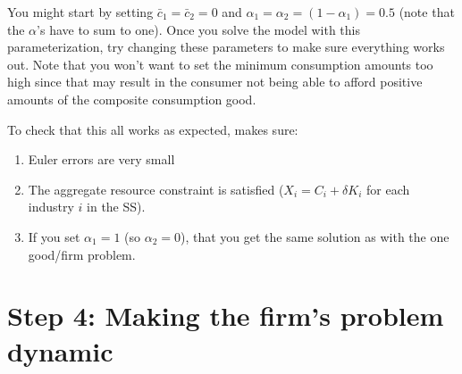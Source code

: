 \documentclass[letterpaper,12pt]{article}
\theoremstyle{definition}
\begin{document}
\begin{spacing}{1.5}
You might start by setting $\bar{c}_{1}=\bar{c}_{2}=0$ and $\alpha_{1}=\alpha_{2}=(1-\alpha_{1})=0.5$ (note that the $\alpha$'s have to sum to one).  Once you solve the model with this parameterization, try changing these parameters to make sure everything works out.  Note that you won't want to set the minimum consumption amounts too high since that may result in the consumer not being able to afford positive amounts of the composite consumption good.

To check that this all works as expected, makes sure:
\begin{enumerate}
\item Euler errors are very small
\item The aggregate resource constraint is satisfied ($X_{i}=C_{i}+\delta K_{i}$ for each industry $i$ in the SS).
\item If you set $\alpha_{1}=1$ (so $\alpha_{2}=0$), that you get the same solution as with the one good/firm problem.
\end{enumerate}

\section*{Step 4: Making the firm's problem dynamic}


\end{spacing}
\end{document}
